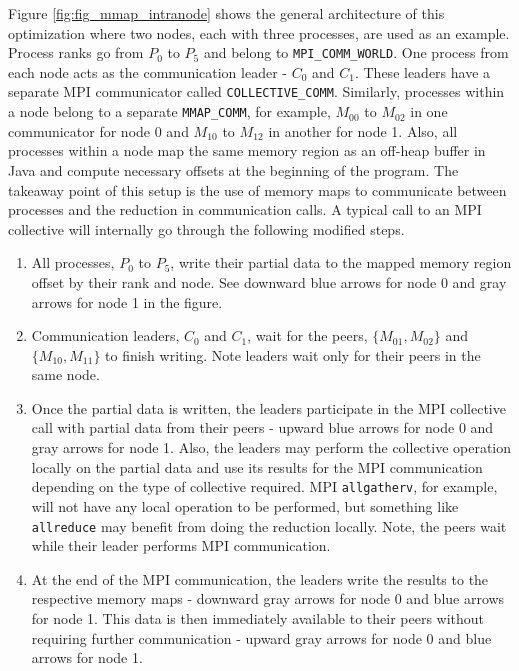 Figure \ref{fig:fig_mmap_intranode} shows the general architecture of this optimization where two nodes, each with three processes, are used as an example. Process ranks go from $P_0$ to $P_5$ and belong to \texttt{MPI\_COMM\_WORLD}. One process from each node acts as the communication leader - $C_0$ and $C_1$. These leaders have a separate MPI communicator called \texttt{COLLECTIVE\_COMM}. Similarly, processes within a node belong to a separate \texttt{MMAP\_COMM}, for example, $M_{00}$ to $M_{02}$ in one communicator for node 0 and $M_{10}$ to $M_{12}$ in another for node 1. Also, all processes within a node map the same memory region as an off-heap buffer in Java and compute necessary offsets at the beginning of the program. The takeaway point of this setup is the use of memory maps to communicate between processes and the reduction in communication  calls. A typical call to an MPI collective will internally go through the following modified steps.

\begin{enumerate}
\item All processes, $P_0$ to $P_5$, write their partial data to the mapped memory region offset by their rank and node. See downward blue arrows for node 0 and gray arrows for node 1 in the figure.
\item Communication leaders, $C_0$ and $C_1$, wait for the peers, $\{M_{01},M_{02}\}$ and $\{M_{10},M_{11}\}$ to finish writing. Note leaders wait only for their peers in the same node.
\item Once the partial data is written, the leaders participate in the MPI collective call with partial data from their peers - upward blue arrows for node 0 and gray arrows for node 1. Also, the leaders may perform the collective operation locally on the partial data and use its results for the MPI communication depending on the type of collective required. MPI \texttt{allgatherv}, for example, will not have any local operation to be performed, but something like \texttt{allreduce} may benefit from doing the reduction locally. Note, the peers wait while their leader performs MPI communication.
\item At the end of the MPI communication, the leaders write the results to the respective memory maps - downward gray arrows for node 0 and blue arrows for node 1. This data is then immediately available to their peers without requiring further communication - upward gray arrows for node 0 and blue arrows for node 1.
\end{enumerate}

